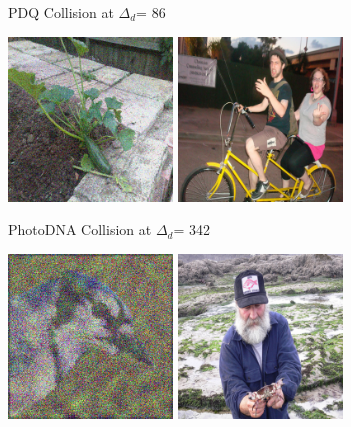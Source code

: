\documentclass[letterpaper]{article}
\newcommand{\maxdist}{\ensuremath{{\Delta_d}}}
\begin{document}
\begin{figure}[t]
\begin{subfigure}[t]{0.48\linewidth}
    \caption{PDQ Collision at \maxdist = 86}
    \label{fig:intro:fuzzy-gen:pdq}
    \end{subfigure}
    \begin{subfigure}[t]{0.48\linewidth}
    \includegraphics[width=0.48\textwidth]{figures/colgen_imgnet_pdna_best_20000.png}
    \includegraphics[width=0.48\textwidth]{figures/colgen_imgnet_pdna_best_target.png}
    \caption{PhotoDNA Collision at \maxdist = 342}
    \label{fig:intro:fuzzy-gen:pdna:best}
    \end{subfigure}
    \begin{subfigure}[t]{0.48\linewidth}
    \includegraphics[width=0.48\textwidth]{figures/colgen_imgnet_pdq_egg_800.png}
    \includegraphics[width=0.48\textwidth]{figures/colgen_imgnet_pdq_egg_target.png}

\end{subfigure}
\end{figure}
\end{document}
